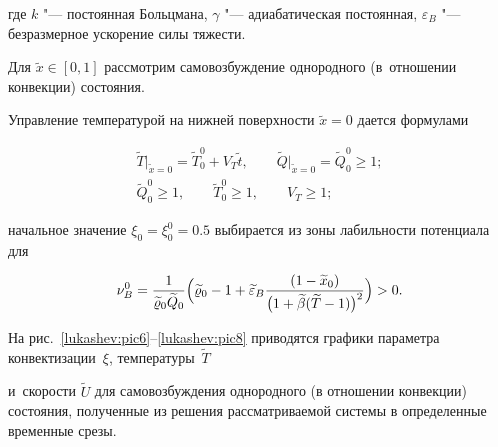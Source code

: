 где $k$ "--- постоянная Больцмана, $\gamma$ "--- адиабатическая постоянная, ${\varepsilon}_B$ "--- безразмерное ускорение силы тяжести.



Для  $\widetilde{x}\in[0, 1]$ рассмотрим самовозбуждение однородного (в~отношении конвекции) состояния.

Управление температурой на нижней поверхности ${\widetilde{x}{=}0}$ дается формулами

\begin{gather}

\widetilde{T}\bigr|_{\widetilde{x}=0}=\widetilde{T}^0_0+V_T \widetilde t, \qquad

\widetilde{Q}\bigr|_{\widetilde{x}=0}=\widetilde{Q}^0_0\ge1;

\label{lukashev:1T}

\\

\widetilde{Q}^0_0\ge1,\qquad \widetilde{T}^0_0\ge1,\qquad V_T\ge1;

\end{gather}

начальное значение  $\xi_0= \xi_0^0=0.5$ выбирается из зоны лабильности потенциала для

$$

\nu_B^0=\frac1{\widetilde{\varrho}_0\widetilde{Q}_0}

\Bigl(

{\widetilde{\varrho}_0-1+\widetilde{\varepsilon}_B\frac {(1- \widetilde{x}_0)}{\bigl(1+\widetilde{\beta}(\widetilde{T}-1)\bigr)^2} }\Bigr)>0.

$$











На рис.~\ref{lukashev:pic6}--\ref{lukashev:pic8} приводятся графики параметра конвектизации~$\xi$, температуры~$\widetilde T$ %

и~скорости $\widetilde U$ для  самовозбуждения однородного (в отношении конвекции) состояния, полученные из решения рассматриваемой системы в определенные временные срезы.



